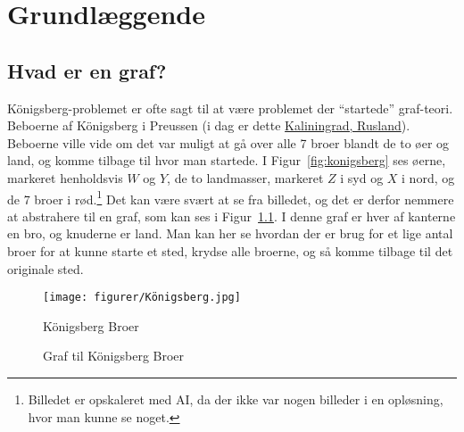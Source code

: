 \chapter{Grundlæggende}

\section{Hvad er en graf?}%
\label{sec:label}

Königsberg-problemet er ofte sagt til at være problemet der ``startede'' graf-teori. Beboerne af Königsberg i Preussen (i dag er dette \href{https://en.wikipedia.org/wiki/Kaliningrad}{Kaliningrad, Rusland}). Beboerne ville vide om det var muligt at gå over alle 7 broer blandt de to øer og land, og komme tilbage til hvor man startede. I Figur~\ref{fig:konigsberg} ses øerne, markeret henholdsvis $W$ og $Y$, de to landmasser, markeret $Z$ i syd og $X$ i nord, og de 7 broer i rød.\footnote{Billedet er opskaleret med AI, da der ikke var nogen billeder i en opløsning, hvor man kunne se noget.} Det kan være svært at se fra billedet, og det er derfor nemmere at abstrahere til en graf, som kan ses i Figur~\ref{fig:konigsberggraf}. I denne graf er hver af kanterne en bro, og knuderne er land. Man kan her se hvordan der er brug for et lige antal broer for at kunne starte et sted, krydse alle broerne, og så komme tilbage til det originale sted.


\begin{figure}[h!]
  \centering
  \begin{minipage}{0.45\textwidth}
    \centering
    \texttt{[image: figurer/Königsberg.jpg]}
    \caption{\label{fig:konigsberg} Königsberg Broer}
  \end{minipage}
  \hfill
  \begin{minipage}{0.45\textwidth}
    \centering
    \caption{\label{fig:konigsberggraf} Graf til Königsberg Broer}
  \end{minipage}
\end{figure}

